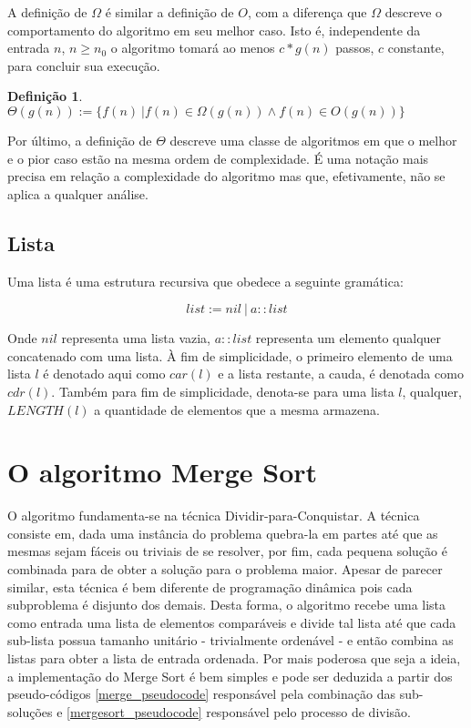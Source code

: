 \documentclass[12pt]{article}
\theoremstyle{definition}
\newtheorem{definition}{Definição}[section]
\begin{document}
A definição de $\Omega$ é similar a definição de $O$, com a diferença que $\Omega$ descreve o comportamento do algoritmo
em seu melhor caso. Isto é, independente da entrada $n$, $n \geq n_0$ o algoritmo tomará ao menos $c * g(n)$ passos, $c$ constante, para concluir
sua execução.

\theoremstyle{definition}
\begin{definition}
        $\Theta(g(n)) := \{f(n)\ | f(n) \in \Omega(g(n)) \wedge f(n) \in O(g(n))\}$        
\end{definition}

Por último, a definição de $\Theta$ descreve uma classe de algoritmos em que o melhor e o pior caso estão na mesma ordem
de complexidade. É uma notação mais precisa em relação a complexidade do algoritmo mas que, efetivamente, não se aplica
a qualquer análise.

\subsection{Lista}

Uma lista é uma estrutura recursiva que obedece a seguinte gramática:

\[list := nil\ |\ a::list\]

Onde $nil$ representa uma lista vazia, $a::list$ representa um elemento qualquer concatenado com uma lista.
À fim de simplicidade, o primeiro elemento de uma lista $l$ é denotado aqui como $car(l)$ e a lista restante,
a cauda, é denotada como $cdr(l)$. Também para fim de simplicidade, denota-se para uma lista $l$, qualquer, $LENGTH(l)$ 
a quantidade de elementos que a mesma armazena. 

\section{O algoritmo Merge Sort}
\label{merge_sort}

O algoritmo fundamenta-se na técnica Dividir-para-Conquistar. A técnica consiste em, dada uma instância do problema
quebra-la em partes até que as mesmas sejam fáceis ou triviais de se resolver, por fim, cada pequena solução é combinada para
de obter a solução para o problema maior. Apesar de parecer similar, esta técnica é bem diferente de programação dinâmica pois
cada subproblema é disjunto dos demais. Desta forma, o algoritmo recebe uma lista como entrada uma lista de elementos comparáveis
e divide tal lista até que cada sub-lista possua tamanho unitário - trivialmente ordenável - e então combina as listas para obter
a lista de entrada ordenada. Por mais poderosa que seja a ideia, a implementação do Merge Sort é bem simples e pode ser deduzida
a partir dos pseudo-códigos \ref{merge_pseudocode} responsável pela combinação das sub-soluções e \ref{mergesort_pseudocode} responsável pelo processo de
divisão.
\end{document}
